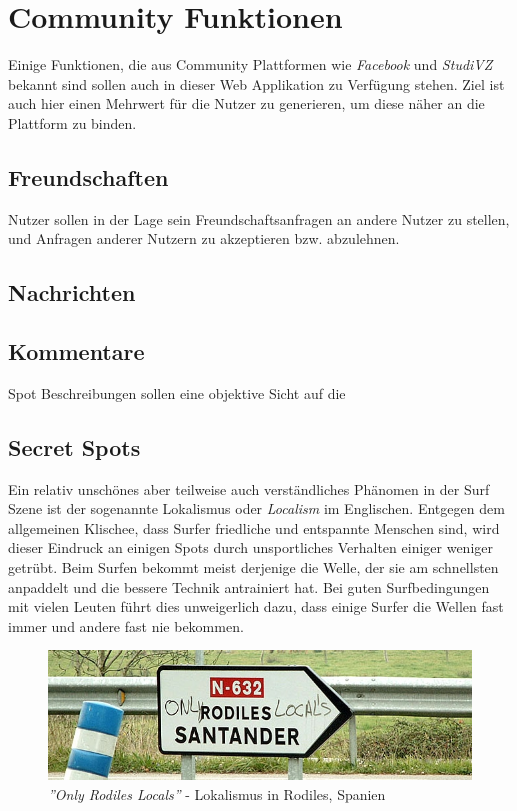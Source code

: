 \section{Community Funktionen}

Einige Funktionen, die aus Community Plattformen wie \textit{Facebook}
und \textit{StudiVZ} bekannt sind sollen auch in dieser Web
Applikation zu Verfügung stehen. Ziel ist auch hier einen Mehrwert für
die Nutzer zu generieren, um diese näher an die Plattform zu binden.

\subsection{Freundschaften}
Nutzer sollen in der Lage sein Freundschaftsanfragen an andere Nutzer
zu stellen, und Anfragen anderer Nutzern zu akzeptieren
bzw. abzulehnen.

\subsection{Nachrichten}

\subsection{Kommentare}
\label{subsec:Kommentare}

Spot Beschreibungen sollen eine objektive Sicht auf die


\subsection{Secret Spots}
Ein relativ unschönes aber teilweise auch verständliches Phänomen in
der Surf Szene ist der sogenannte Lokalismus oder \textit{Localism} im
Englischen. Entgegen dem allgemeinen Klischee, dass Surfer friedliche
und entspannte Menschen sind, wird dieser Eindruck an einigen Spots
durch unsportliches Verhalten einiger weniger getrübt. Beim Surfen
bekommt meist derjenige die Welle, der sie am schnellsten anpaddelt
und die bessere Technik antrainiert hat. Bei guten Surfbedingungen mit
vielen Leuten führt dies unweigerlich dazu, dass einige Surfer die
Wellen fast immer und andere fast nie bekommen.

\begin{figure}[h]
  \begin{center}
    \includegraphics[width=\textwidth]{bilder/locals-only}
    \caption{\textit{''Only Rodiles Locals''} - Lokalismus in Rodiles,
      Spanien}
    \label{locals-only}
  \end{center}
\end{figure}

